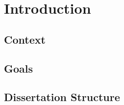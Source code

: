 \chapter{Introduction} \label{chap:intro}

\section{Context} \label{sec:context}

\section{Goals} \label{sec:goals}

\section{Dissertation Structure} \label{sec:struct}
